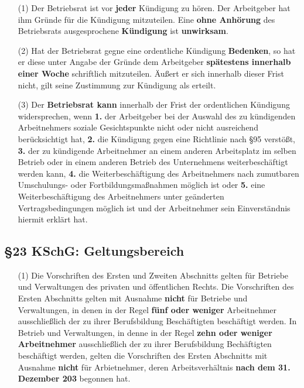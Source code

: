 \documentclass[a4paper, 12pt]{report}
\begin{document}
\begin{itemize}
    \item[(1)] Der Betriebsrat ist vor \textbf{jeder} Kündigung zu hören. Der 
        Arbeitgeber hat ihm Gründe für die Kündigung mitzuteilen. Eine 
        \textbf{ohne Anhörung} des Betriebsrats ausgesprochene 
        \textbf{Kündigung} ist \textbf{unwirksam}.
    \item[(2)] Hat der Betriebsrat gegne eine ordentliche Kündigung 
        \textbf{Bedenken}, so hat er diese unter Angabe der Gründe dem 
        Arbeitgeber \textbf{spätestens innerhalb einer Woche} schriftlich 
        mitzuteilen. Äußert er sich innerhalb dieser Frist nicht, gilt seine 
        Zustimmung zur Kündigung als erteilt. 
    \item[(3)] Der \textbf{Betriebsrat kann} innerhalb der Frist der 
        ordentlichen Kündigung widersprechen, wenn \textbf{1.} der Arbeitgeber
        bei der Auswahl des zu kündigenden Arbeitnehmers soziale Gesichtspunkte
        nicht oder nicht ausreichend berücksichtigt hat, \textbf{2.} die 
        Kündigung gegen eine Richtlinie nach \S 95 verstößt, \textbf{3.} der 
        zu kündigende Arbeitnehmer an einem anderen Arbeitsplatz im selben 
        Betrieb oder in einem anderen Betrieb des Unternehmens weiterbeschäftigt
        werden kann, \textbf{4.} die Weiterbeschäftigung des Arbeitnehmers nach
        zumutbaren Umschulungs- oder Fortbildungsmaßnahmen möglich ist oder 
        \textbf{5.} eine Weiterbeschäftigung des Arbeitnehmers unter geänderten 
        Vertragsbedingungen möglich ist und der Arbeitnehmer sein Einverständnis
        hiermit erklärt hat. 
\end{itemize}

\subsection{\S 23 KSchG: Geltungsbereich}

\begin{itemize}
    \item[(1)] Die Vorschriften des Ersten und Zweiten Abschnitts gelten für 
        Betriebe und Verwaltungen des privaten und öffentlichen Rechts. Die 
        Vorschriften des Ersten Abschnitts gelten mit Ausnahme \textbf{nicht} 
        für Betriebe und Verwaltungen, in denen in der Regel 
        \textbf{fünf oder weniger} Arbeitnehmer ausschließlich der zu ihrer 
        Berufsbildung Beschäftigten beschäftigt werden. In Betrieb und 
        Verwaltungen, in denne in der Regel \textbf{zehn oder weniger 
        Arbeitnehmer} ausschließlich der zu ihrer Berufsbildung Bechäftigten 
        beschäftigt werden, gelten die Vorschriften des Ersten Abschnitts mit 
        Ausnahme \textbf{nicht} für Arbietnehmer, deren Arbeitsverhältnis 
        \textbf{nach dem 31. Dezember 203} begonnen hat. 
\end{itemize}
\end{document}
